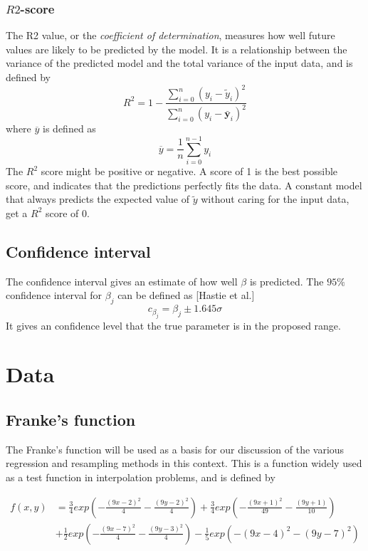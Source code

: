 \documentclass{article}
\begin{document}
\subsubsection{$R2$-score}
The R2 value, or the \textit{coefficient of determination}, measures how well future values are likely to be predicted by the model. It is a relationship between the variance of the predicted model and the total variance of the input data, and is defined by
\begin{equation}\label{R2score}
R^{2} = 1-\frac{\sum_{i=0}^{n}(y_{i} - \tilde{y}_{i})^{2}}{\sum_{i=0}^{n}(y_{i} - \bar{\textbf{y}}_{i})^{2}}
\end{equation}
where $\overline{y}$ is defined as
\begin{equation}
\overline{y} = \dfrac{1}{n} \sum_{i=0}^{n-1} y_{i}
\end{equation}
The $R^{2}$ score might be positive or negative. A score of 1 is the best possible score, and indicates that the predictions perfectly fits the data. A constant model that always predicts the expected value of $\tilde{y}$ without caring for the input data, get a $R^{2}$ score of 0.
\subsection{Confidence interval}
The confidence interval gives an estimate of how well $\beta$ is predicted. The $95\%$ confidence interval for $\beta_{j}$ can be defined as [Hastie et al.]
\begin{equation}
c_{\beta_{j}} = \beta_{j} \pm 1.645 \sigma
\end{equation}
It gives an confidence level that the true parameter is in the proposed range. 
\section{Data}
\subsection{Franke's function}
The Franke's function will be used as a basis for our discussion of the various regression and resampling methods in this context. This is a function  widely used as a test function in interpolation problems, and is defined by

\begin{align*}
f(x,y) &= \frac{3}{4}exp\left(-\frac{(9x-2)^2}{4} - \frac{(9y-2)^2}{4}\right)+\frac{3}{4}exp\left(-\frac{(9x+1)^2}{49} - \frac{(9y+1)}{10}\right)\\
&+ \frac{1}{2}exp\left(-\frac{(9x-7)^2}{4} - \frac{(9y-3)^2}{4}\right)-\frac{1}{5}exp\left(-(9x-4)^2 - (9y-7)^2\right)
\end{align*}
\end{document}
